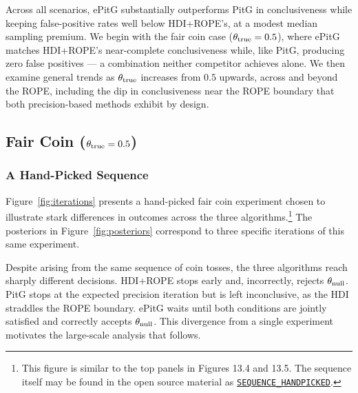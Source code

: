 Across all scenarios, ePitG substantially outperforms PitG in conclusiveness while
keeping false-positive rates well below HDI+ROPE's, at a modest median sampling premium.
We begin with the fair coin case ($\theta_{\rm true}=0.5$), where ePitG matches
HDI+ROPE's near-complete conclusiveness while, like PitG, producing zero false
positives --- a combination neither competitor achieves alone.
We then examine general trends as $\theta_{\rm true}$ increases from $0.5$ upwards,
across and beyond the ROPE, including the dip in conclusiveness near the ROPE boundary
that both precision-based methods exhibit by design.

\subsection{Fair Coin ($\theta_{\rm true}=0.5$)}\label{sec:fair_coin}

\subsubsection{A Hand-Picked Sequence}\label{sec:fair_coin_sequence}

Figure~\ref{fig:iterations} presents a hand-picked fair coin experiment chosen to
illustrate stark differences in outcomes across the three algorithms.\footnote{This figure
is similar to the top panels in \cite{kruschke2015doing} Figures 13.4 and 13.5.
The sequence itself may be found in the open source material as 
\href{https://github.com/elzurdo/precision-goal/blob/main/py/utils_experiments.py\#L28}{\texttt{SEQUENCE\_HANDPICKED}}.}
The posteriors in Figure~\ref{fig:posteriors} correspond to three specific iterations
of this same experiment.

Despite arising from the same sequence of coin tosses, the three algorithms reach
sharply different decisions. HDI+ROPE stops early and, incorrectly, rejects
$\theta_{\rm null}$. PitG stops at the expected precision iteration but is left
inconclusive, as the HDI straddles the ROPE boundary. ePitG waits until both conditions
are jointly satisfied and correctly accepts $\theta_{\rm null}$. This divergence from a
single experiment motivates the large-scale analysis that follows.

